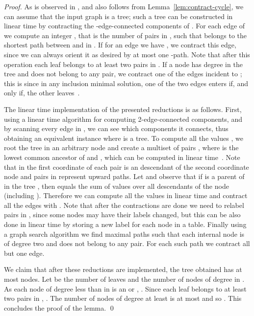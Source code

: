 \documentclass[envcountsame]{llncs}
\begin{document}
\begin{proof}
As is observed in \cite{HM}, and also follows from Lemma~\ref{lem:contract-cycle},
we can assume that the input graph  is a tree; such a tree can be constructed in linear time
by contracting the -edge-connected components of .
For each edge  of  we compute an integer ,
that is the number of pairs  in , such that 
belongs to the shortest path between  and  in .
If for an edge  we have , we contract this edge,
since we can always orient it as desired by at most one -path.
Note that after this operation each leaf belongs to at least two pairs in .
If a node  has degree  in the tree and does not belong to any pair,
we contract one of the edges incident to ; this is since in any inclusion minimal solution,
one of the two edges enters  if, and only if, the other leaves~. 

The linear time implementation of the presented reductions is as follows.
First, using a linear time algorithm for computing 2-edge-connected components,
and by scanning every edge in , we can see which components it connects,
thus obtaining an equivalent instance where  is a tree.
To compute all the values , we root the tree in an arbitrary node
and create a multiset of pairs ,
where  is the lowest common ancestor of  and ,
which can be computed in linear time~\cite{HT}.
Note that in  the first coordinate of each pair is an descendant of the second coordinate node
and pairs in  represent upward paths.
Let  and observe that 
if  is a parent of  in the tree , then  equals
the sum of values  over all descendants  of the node  (including ).
Therefore we can compute all the values  in linear time
and contract all the edges with .
Note that after the contractions are done we need to relabel pairs in ,
since some nodes may have their labels changed,
but this can be also done in linear time by storing a new label for each node
in a table.
Finally using a graph search algorithm we find maximal paths such
that each internal node is of degree two and does not belong to any pair.
For each such path we contract all but one edge.

We claim that after these reductions are implemented, the tree  obtained has at most  nodes. 
Let  be the number of leaves and  the number of nodes of degree  in . 
As each node of degree less than  in  is an  or , .
Since each leaf belongs to at least two pairs in , .
The number of nodes of degree at least  is at most 
 and so .
This concludes the proof of the lemma.
\qed
\end{proof}
\end{document}
